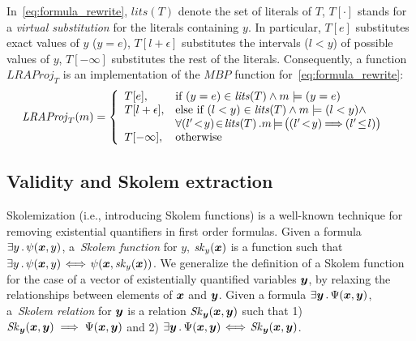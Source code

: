 In~\eqref{eq:formula_rewrite}, $\mathit{lits}(T)$ denote the set of literals of $T$, $T[\cdot]$ stands for a \emph{virtual substitution} for the literals containing $y$.
In particular, $T[e]$ substitutes exact values of $y$ ($y=e$), $T[l+\epsilon]$ substitutes the intervals ($l < y$) of possible values of $y$, $T[-\infty]$ substitutes the rest of the literals.
Consequently, a function $\mathit{LRAProj_{T}}$ is an implementation of the $\mathit{MBP}$ function for~\eqref{eq:formula_rewrite}:%
%
\begin{equation}
\begin{aligned}
\label{case:proj_define}
&\mathit{LRAProj}_{T}(m) = \left\{
\begin{array}{ll}
T[e], 			& \mbox{if}\ (y=e) \in \mathit{lits}(T) \land 
			m \models (y = e)\\
T[l+ \epsilon],	& \mbox{else if}\ (l < y) \in \mathit{lits}(T) 
			\land m \models (l < y) \land \\
			& \forall (l'\!<\!y)\!\in\!\mathit{lits}(T) \such \!m\!\models\!\big((l'\!<\!y)\!\!\implies\!\!(l'\! \le\! l)\big)\\
T[-\infty], 		& \mbox{otherwise}	
\end{array}
\right.
\end{aligned}
\end{equation}





\subsection{Validity and Skolem extraction}
\label{sim:check}

\aevalalgorithm  

Skolemization (i.e., introducing Skolem functions) is a well-known
technique for removing existential quantifiers in first order formulas.
%
Given a formula ${ \exists y \such \psi(\vx, y)}$,
a~\emph{Skolem function} for $y$, $\mathit{sk}_{y}(\vx)$ is a function such that
$\exists y \such \psi(\vx,y)\!\iff\!\psi (\vx, \mathit{sk}_{y} (\vx))$.
We generalize the definition of a Skolem function for the case of a
vector of existentially quantified variables $\vy$, by relaxing the
relationships between elements of $\vx$ and $\vy$.
Given a formula ${\exists \vy \such \Psi(\vx, \vy)}$, a~\emph{Skolem relation} for $\vy$ is a relation ${\mathit{Sk}_{\vy} (\vx, \vy)}$ such that 1) $\mathit{Sk}_{\vy} (\vx, \vy) \implies \Psi (\vx, \vy)$ and 2) $\exists \vy \such \Psi(\vx, \vy)\!\iff\!\mathit{Sk}_{\vy} (\vx, \vy)$.
  

